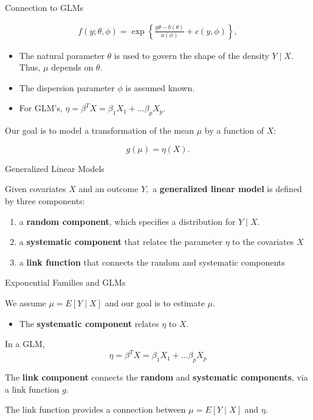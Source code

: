 \documentclass[
  ignorenonframetext,
]{beamer}
\providecommand{\tightlist}{%
  \setlength{\itemsep}{0pt}\setlength{\parskip}{0pt}}
\begin{document}
\begin{frame}{Connection to GLMs}
\protect\hypertarget{connection-to-glms-1}{}

\begin{align}
f(y; \theta, \phi) = \exp\left\{ \frac{y\theta - b(\theta)}{a(\phi)} + c(y,\phi) \right\},
\end{align}

\begin{itemize}
\item
  The natural parameter \(\theta\) is used to govern the shape of the
  density \(Y\mid X.\) Thus, \(\mu\) depends on \(\theta.\)
\item
  The dispersion parameter \(\phi\) is assumed known.
\item
  For GLM's, \(\eta = \beta^T X= \beta_1 X_1 + \ldots \beta_p X_p.\)
\end{itemize}

Our goal is to model a transformation of the mean \(\mu\) by a function
of \(X\):

\[g(\mu) = \eta(X).\]

\end{frame}

\begin{frame}{Generalized Linear Models}
\protect\hypertarget{generalized-linear-models}{}

Given covariates \(X\) and an outcome \(Y,\) a \textbf{generalized
linear model} is defined by three components:

\begin{enumerate}
\tightlist
\item
  a \textbf{random component}, which specifies a distribution for
  \(Y \mid X.\)
\item
  a \textbf{systematic component} that relates the parameter \(\eta\) to
  the covariates \(X\)
\item
  a \textbf{link function} that connects the random and systematic
  components
\end{enumerate}

\end{frame}

\begin{frame}{Exponential Families and GLMs}
\protect\hypertarget{exponential-families-and-glms}{}

We assume \(\mu = E[Y\mid X]\) and our goal is to estimate \(\mu.\)

\begin{itemize}
\tightlist
\item
  The \textbf{systematic component} relates \(\eta\) to \(X.\)
\end{itemize}

In a GLM, \[\eta = \beta^T X = \beta_1 X_1 + \ldots \beta_p X_p\]

The \textbf{link component} connects the \textbf{random} and
\textbf{systematic components}, via a link function \(g.\)

The link function provides a connection between \(\mu = E[Y\mid X]\) and
\(\eta.\)

\end{frame}
\end{document}
